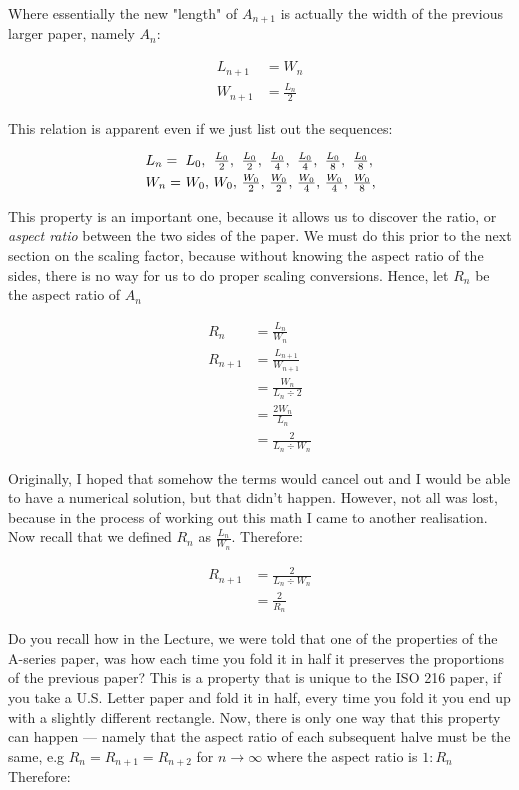 \noindent
Where essentially the new "length" of $A_{n + 1}$ is actually the width of the previous larger paper, namely $A_{n}$:

\begin{align*}
  L_{n + 1} &= W_{n} \\
  W_{n + 1} &= \frac{L_{n}}{2}
\end{align*}

\noindent
This relation is apparent even if we just list out the sequences:

\[
  \begin{array}{*{8}{l@{\ }}}
    L_{n} = & L_{0}, & \frac{L_0}{2}, & \frac{L_{0}}{2}, & \frac{L_{0}}{4}, & \frac{L_{0}}{4}, & \frac{L_{0}}{8}, & \frac{L_{0}}{8}, \\[\jot]
    W_{n} = & W_{0}, &         W_{0}, & \frac{W_{0}}{2}, & \frac{W_{0}}{2}, & \frac{W_{0}}{4}, & \frac{W_{0}}{4}, & \frac{W_{0}}{8},
  \end{array}
\]

\noindent
This property is an important one, because it allows us to discover the ratio, or \emph{aspect ratio} between the two sides of the paper. We must do this prior to the next section on the scaling factor, because without knowing the aspect ratio of the sides, there is no way for us to do proper scaling conversions. Hence, let $R_{n}$ be the aspect ratio of $A_{n}$

\begin{align*}
  R_{n}     &= \frac{L_{n}}{W_{n}} \\
  R_{n + 1} &= \frac{L_{n + 1}}{W_{n + 1}} \\
            &= \frac{W_{n}}{L_{n} \div 2} \\
            &= \frac{2W_{n}}{L_{n}} \\
            &= \frac{2}{L_{n} \div W_{n}}
\end{align*}

\noindent
Originally, I hoped that somehow the terms would cancel out and I would be able to have a numerical solution, but that didn't happen. However, not all was lost, because in the process of working out this math I came to another realisation. Now recall that we defined $R_{n}$ as $\frac{L_{n}}{W_{n}}$. Therefore:

\begin{align*}
  R_{n + 1} &= \frac{2}{L_{n} \div W_{n}} \\
            &= \frac{2}{R_{n}}
\end{align*}

\noindent
Do you recall how in the Lecture, we were told that one of the properties of the A-series paper, was how each time you fold it in half it preserves the proportions of the previous paper? This is a property that is unique to the ISO 216 paper, if you take a U.S. Letter paper and fold it in half, every time you fold it you end up with a slightly different rectangle. Now, there is only one way that this property can happen --- namely that the aspect ratio of each subsequent halve must be the same, e.g $R_{n} = R_{n + 1} = R_{n + 2}$ for $n \to \infty$ where the aspect ratio is $1:R_{n}$ Therefore:

